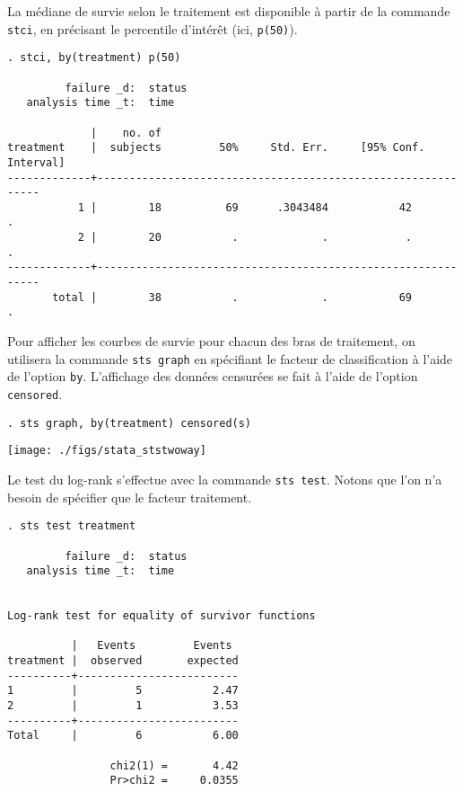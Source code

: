 La médiane de survie selon le traitement est disponible à partir de la
commande \texttt{stci}, en précisant le percentile d'intérêt (ici,
\texttt{p(50)}). 
\begin{verbatim}
. stci, by(treatment) p(50)

         failure _d:  status
   analysis time _t:  time

             |    no. of 
treatment    |  subjects         50%     Std. Err.     [95% Conf. Interval]
-------------+-------------------------------------------------------------
           1 |        18          69      .3043484           42          .
           2 |        20           .             .            .          .
-------------+-------------------------------------------------------------
       total |        38           .             .           69          .
\end{verbatim}


Pour afficher les courbes de survie pour chacun des bras de traitement, on
utilisera la commande \texttt{sts graph} en spécifiant le facteur de
classification à l'aide de l'option \texttt{by}. L'affichage des données
censurées se fait à l'aide de l'option \texttt{censored}.
\begin{verbatim}
. sts graph, by(treatment) censored(s)
\end{verbatim}

\texttt{[image: ./figs/stata\_ststwoway]}

Le test du log-rank s'effectue avec la commande \texttt{sts test}. Notons
que l'on n'a besoin de spécifier que le facteur traitement.
\begin{verbatim}
. sts test treatment

         failure _d:  status
   analysis time _t:  time


Log-rank test for equality of survivor functions

          |   Events         Events
treatment |  observed       expected
----------+-------------------------
1         |         5           2.47
2         |         1           3.53
----------+-------------------------
Total     |         6           6.00

                chi2(1) =       4.42
                Pr>chi2 =     0.0355
\end{verbatim}

